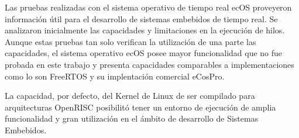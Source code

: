 Las pruebas realizadas con el sistema operativo de tiempo real ecOS proveyeron información útil para el desarrollo de sistemas embebidos de tiempo
real. Se analizaron inicialmente las capacidades y limitaciones en la ejecución de hilos. Aunque estas pruebas tan solo verifican la utilización de
una parte las capacidades, el sistema operativo ecOS posee mayor funcionalidad que no fue probada en este trabajo y presenta capacidades comparables
a implementaciones como lo son FreeRTOS y su implentación comercial eCosPro.
	
La capacidad, por defecto, del Kernel de Linux de ser compilado para arquitecturas OpenRISC posibilitó tener un entorno de ejecución de amplia
funcionalidad y gran utilización en el ámbito de desarrollo de Sistemas Embebidos.
	
